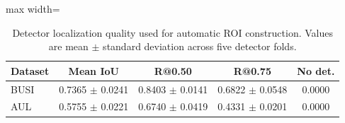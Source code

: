 ﻿\begin{table}[t]
    \centering
    \small
    \caption{Detector localization quality used for automatic ROI construction. Values are mean $\pm$ standard deviation across five detector folds.}
    \label{tab:auto_roi_detector_quality}
    \begin{adjustbox}{max width=\columnwidth}
    \begin{tabular}{lcccc}
        \toprule
        Dataset & Mean IoU & R@0.50 & R@0.75 & No det. \\
        \midrule
        BUSI & 0.7365 $\pm$ 0.0241 & 0.8403 $\pm$ 0.0141 & 0.6822 $\pm$ 0.0548 & 0.0000 \\
        AUL & 0.5755 $\pm$ 0.0221 & 0.6740 $\pm$ 0.0419 & 0.4331 $\pm$ 0.0201 & 0.0000 \\
        \bottomrule
    \end{tabular}
    \end{adjustbox}
\end{table}
